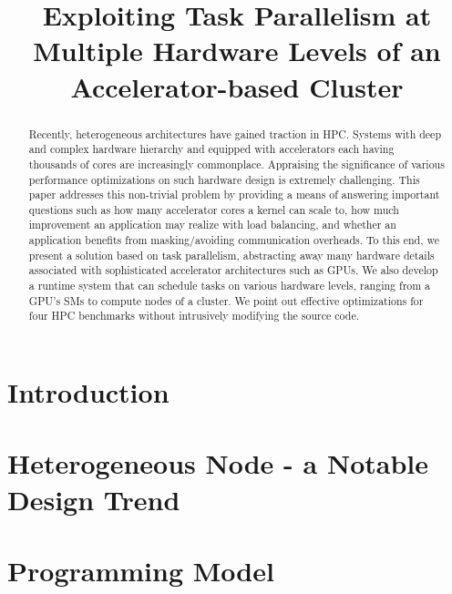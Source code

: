 \documentclass[sigconf]{acmart}
\begin{document}
\title{Exploiting Task Parallelism at Multiple Hardware Levels of an Accelerator-based Cluster}


\begin{abstract}
Recently, heterogeneous architectures have gained traction in HPC. Systems with deep and complex hardware hierarchy and equipped with accelerators each having thousands of cores are increasingly commonplace. Appraising the significance of various performance optimizations on such hardware design is extremely challenging. This paper addresses this non-trivial problem by providing a means of answering important questions such as how many accelerator cores a kernel can scale to, how much improvement an application may realize with load balancing, and whether an application benefits from masking/avoiding communication overheads. To this end, we present a solution based on task parallelism, abstracting away many hardware details associated with sophisticated accelerator architectures such as GPUs. We also develop a runtime system that can schedule tasks on various hardware levels, ranging from a GPU's SMs to compute nodes of a cluster. We point out effective optimizations for four HPC benchmarks without intrusively modifying the source code.
\end{abstract}

\maketitle

\section{Introduction}
\label{sec:intro}


\section{Heterogeneous Node - a Notable Design Trend}
\label{sec:motivation}


\section{Programming Model}
\label{sec:model}

\end{document}
